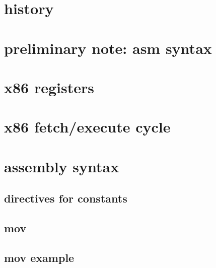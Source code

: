 
\begin{frame}
    \titlepage
\end{frame}

\section{history}





\section{preliminary note: asm syntax}



\section{x86 registers}




\section{x86 fetch/execute cycle}



\section{assembly syntax}

\subsection{directives for constants}



\subsection{mov}


\subsection{mov example}


